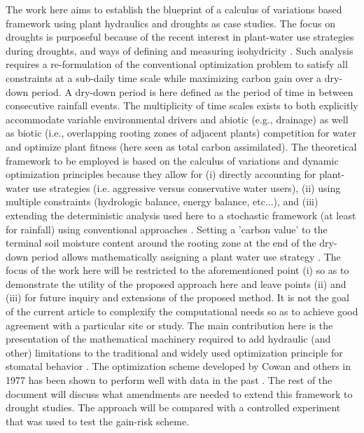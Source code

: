 \documentclass[utf8]{frontiersSCNS} %
\begin{document}
The work here aims to establish the blueprint of a calculus of variations based framework using plant hydraulics and droughts as case studies.  The focus on droughts is purposeful because of the recent interest in plant-water use strategies during droughts, and ways of defining and measuring isohydricity \citep{franks_anisohydric_2007,martinezvilalta_new_2014,meinzer_mapping_2016}.  Such analysis requires a re-formulation of the conventional optimization problem to satisfy all constraints at a sub-daily time scale while maximizing carbon gain over a dry-down period. A dry-down period is here defined as the period of time in between consecutive rainfall events. The multiplicity of time scales exists to both explicitly accommodate variable environmental drivers and abiotic (e.g., drainage) as well as biotic (i.e., overlapping rooting zones of adjacent plants) competition for water and optimize plant fitness (here seen as total carbon assimilated). The theoretical framework to be employed is based on the calculus of variations and dynamic optimization principles because they allow for (i) directly accounting for plant-water use strategies (i.e. aggressive versus conservative water users), (ii) using multiple constraints (hydrologic balance, energy balance, etc...), and  (iii) extending the deterministic analysis used here to a stochastic framework (at least for rainfall) using conventional approaches  \citep{cowan1986economics,makela1996optimal,manzoni_optimization_2013,lu2016optimal}.  Setting a 'carbon value' to the terminal soil moisture content around the rooting zone at the end of the dry-down period allows mathematically assigning a plant water use strategy \citep{manzoni_optimization_2013}.   The focus of the work here will be restricted to the aforementioned point (i) so as to demonstrate the utility of the proposed approach here and leave points (ii) and (iii) for future inquiry and extensions of the proposed method. It is not the goal of the current article to complexify the computational needs so as to achieve good agreement with a particular site or study. The main contribution here is the presentation of the mathematical machinery required to add hydraulic (and other) limitations to the traditional and widely used optimization principle for stomatal behavior \citep{cowan_stomatal_1977,cowan1986economics}. The optimization scheme developed by Cowan and others in 1977 has been shown to perform well with data in the past \citep{dubois_2007,gu_2010}. The rest of the document will discuss what amendments are needed to extend this framework to drought studies.  The approach will be compared with a controlled experiment \citep{venturas_2018} that was used to test the gain-risk scheme.
\end{document}
